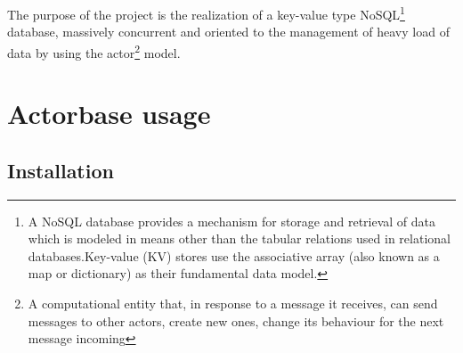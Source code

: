 \documentclass{scalatekids-article}
\begin{document}
The purpose of the project is the realization of a key-value type
NoSQL\footnote{A NoSQL database provides a mechanism for storage and retrieval
of data which is modeled in means other than the tabular relations used in
relational databases.Key-value (KV) stores use the associative array (also known
as a map or dictionary) as their fundamental data model.\label{nosql}} database,
massively concurrent and oriented to the management of heavy load of data by
using the actor\footnote{A computational entity that, in response to a message
it receives, can send messages to other actors, create new ones, change its
behaviour for the next message incoming\label{actor}} model.











\section{Actorbase usage}

\subsection{Installation}
\end{document}
